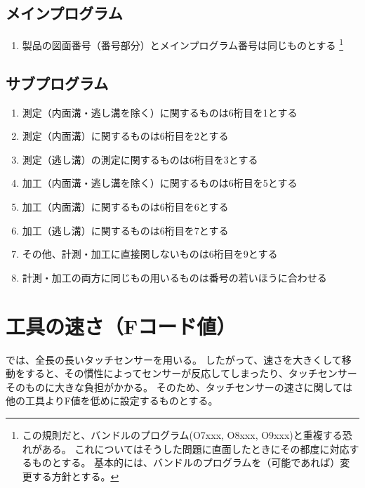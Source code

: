 \subsection{メインプログラム}
\begin{enumerate}
\item 製品の図面番号（番号部分）とメインプログラム番号は同じものとする
\footnote{この規則だと、バンドルのプログラム(O7xxx, O8xxx, O9xxx)と重複する恐れがある。
これについてはそうした問題に直面したときにその都度に対応するものとする。
基本的には、バンドルのプログラムを（可能であれば）変更する方針とする。}
\end{enumerate}



\subsection{サブプログラム}
\begin{enumerate}
\item 測定（内面溝・逃し溝を除く）に関するものは6桁目を1とする
\item 測定（内面溝）に関するものは6桁目を2とする
\item 測定（逃し溝）の測定に関するものは6桁目を3とする
\item 加工（内面溝・逃し溝を除く）に関するものは6桁目を5とする
\item 加工（内面溝）に関するものは6桁目を6とする
\item 加工（逃し溝）に関するものは6桁目を7とする
\item その他、計測・加工に直接関しないものは6桁目を9とする
\item 計測・加工の両方に同じもの用いるものは番号の若いほうに合わせる
\end{enumerate}



\section{工具の速さ（Fコード値）}
\DMname では、全長の長いタッチセンサーを用いる。
したがって、速さを大きくして移動をすると、その慣性によってセンサーが反応してしまったり、タッチセンサーそのものに大きな負担がかかる。
そのため、タッチセンサーの速さに関しては他の工具よりF値を低めに設定するものとする。



